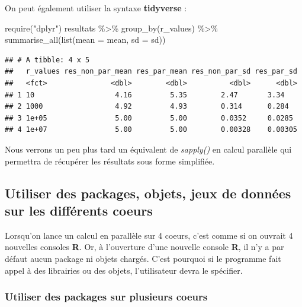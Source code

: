 \documentclass[
]{book}
\newenvironment{Shaded}{\begin{snugshade}}{\end{snugshade}}
\newcommand{\AttributeTok}[1]{\textcolor[rgb]{0.77,0.63,0.00}{#1}}
\newcommand{\FunctionTok}[1]{\textcolor[rgb]{0.00,0.00,0.00}{#1}}
\newcommand{\NormalTok}[1]{#1}
\newcommand{\SpecialCharTok}[1]{\textcolor[rgb]{0.00,0.00,0.00}{#1}}
\newcommand{\StringTok}[1]{\textcolor[rgb]{0.31,0.60,0.02}{#1}}
\theoremstyle{definition}
\theoremstyle{definition}
\theoremstyle{definition}
\theoremstyle{definition}
\theoremstyle{remark}
\begin{document}
On peut également utiliser la syntaxe \textbf{tidyverse} :

\begin{Shaded}
\begin{Highlighting}[]
\FunctionTok{require}\NormalTok{(}\StringTok{"dplyr"}\NormalTok{)}
\NormalTok{resultats }\SpecialCharTok{\%\textgreater{}\%}
  \FunctionTok{group\_by}\NormalTok{(r\_values) }\SpecialCharTok{\%\textgreater{}\%}
  \FunctionTok{summarise\_all}\NormalTok{(}\FunctionTok{list}\NormalTok{(}\AttributeTok{mean =}\NormalTok{ mean, }\AttributeTok{sd =}\NormalTok{ sd))}
\end{Highlighting}
\end{Shaded}

\begin{verbatim}
## # A tibble: 4 x 5
##   r_values res_non_par_mean res_par_mean res_non_par_sd res_par_sd
##   <fct>               <dbl>        <dbl>          <dbl>      <dbl>
## 1 10                   4.16         5.35        2.47       3.34   
## 2 1000                 4.92         4.93        0.314      0.284  
## 3 1e+05                5.00         5.00        0.0352     0.0285 
## 4 1e+07                5.00         5.00        0.00328    0.00305
\end{verbatim}

Nous verrons un peu plus tard un équivalent de \emph{sapply()} en calcul parallèle qui permettra de récupérer les résultats sous forme simplifiée.

\hypertarget{utiliser-des-packages-objets-jeux-de-donnuxe9es-sur-les-diffuxe9rents-coeurs}{%
\subsection{Utiliser des packages, objets, jeux de données sur les différents coeurs}\label{utiliser-des-packages-objets-jeux-de-donnuxe9es-sur-les-diffuxe9rents-coeurs}}

Lorsqu'on lance un calcul en parallèle sur 4 coeurs, c'est comme si on ouvrait 4 nouvelles consoles \textbf{R}. Or, à l'ouverture d'une nouvelle console \textbf{R}, il n'y a par défaut aucun package ni objets chargés. C'est pourquoi si le programme fait appel à des librairies ou des objets, l'utilisateur devra le spécifier.

\hypertarget{utiliser-des-packages-sur-plusieurs-coeurs}{%
\subsubsection{Utiliser des packages sur plusieurs coeurs}\label{utiliser-des-packages-sur-plusieurs-coeurs}}
\end{document}
